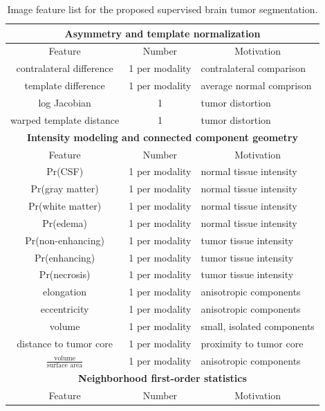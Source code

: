 \documentclass[preprint,authoryear,review,12pt]{elsarticle}
\begin{document}
\begin{table}
\caption{Image feature list for the proposed supervised brain tumor segmentation.}
\label{table:features}
\centering
\begin{tabular*}{0.99\textwidth}{@{\extracolsep{\fill}} c c l}
\toprule
\multicolumn{3}{c}{\bf Asymmetry and template normalization} \\
\midrule
\multicolumn{1}{c}{Feature} & \multicolumn{1}{c}{Number} & \multicolumn{1}{c}{Motivation} \\
\midrule
contralateral difference & 1 per modality & contralateral comparison \\
template difference  & 1 per modality & average normal comprison\\
log Jacobian &  1 & tumor distortion \\
warped template distance & 1 & tumor distortion \\
\midrule
\multicolumn{3}{c}{\bf Intensity modeling and connected component geometry} \\
\midrule
\multicolumn{1}{c}{Feature} & \multicolumn{1}{c}{Number} & \multicolumn{1}{c}{Motivation} \\
\midrule
Pr(CSF)  & 1 per modality & normal tissue intensity\\
Pr(gray matter) & 1 per modality & normal tissue intensity\\
Pr(white matter) & 1 per modality & normal tissue intensity\\
Pr(edema) & 1 per modality & normal tissue intensity\\
Pr(non-enhancing) & 1 per modality & tumor tissue intensity\\
Pr(enhancing) & 1 per modality & tumor tissue intensity\\
Pr(necrosis) & 1 per modality & tumor tissue intensity\\
elongation & 1 per modality & anisotropic components \\
eccentricity & 1 per modality & anisotropic components \\
volume & 1 per modality & small, isolated components \\
distance to tumor core & 1 per modality & proximity to tumor core \\
$\frac{\mathrm{volume}}{\mathrm{surface\,\,area}}$ & 1 per modality & anisotropic components \\
\midrule
\multicolumn{3}{c}{\bf Neighborhood first-order statistics} \\
\midrule
\multicolumn{1}{c}{Feature} & \multicolumn{1}{c}{Number} & \multicolumn{1}{c}{Motivation} \\

\end{tabular*}
\end{table}
\end{document}
